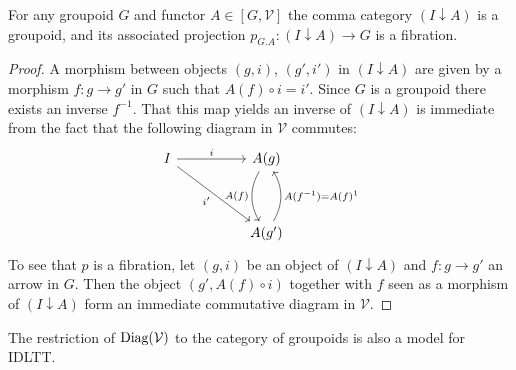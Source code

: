 \begin{lem}
For any groupoid $G$ and functor $A \in [G, \mathcal{V}]$ the comma category $(I \downarrow A)$ is a groupoid, and its associated projection $p_{G.A} : (I \downarrow A) \to G$ is a fibration.
\begin{proof}
A morphism between objects $(g, i)$, $(g', i')$ in $(I \downarrow A)$ are given by a morphism $f : g \to g'$ in $G$ such that $A(f) \circ i = i'$. Since $G$ is a groupoid there exists an inverse $f^{-1}$. That this map yields an inverse of $(I \downarrow A)$ is immediate from the fact that the following diagram in $\mathcal{V}$ commutes:
\[
\ti
I \ar[rd,"i'",swap] \ar[r, "i"] & A(g) \ar[d, "A(f)", bend right,swap] \\
& A(g') \ar[u, "A(f^{-1}) = A(f)^{1}", bend right,swap]
\kz
\]
To see that $p$ is a fibration, let $(g, i)$ be an object of $(I \downarrow A)$ and $f : g \to g'$ an arrow in $G$. Then the object $(g', A(f)\circ i)$ together with $f$ seen as a morphism of $(I \downarrow A)$ form an immediate commutative diagram in $\mathcal{V}$.
\end{proof}
\end{lem}
\begin{cor}
The restriction of $\operatorname{\text{Diag}}(\mathcal{V})$ to the category of groupoids is also a model for IDLTT.
\end{cor}
